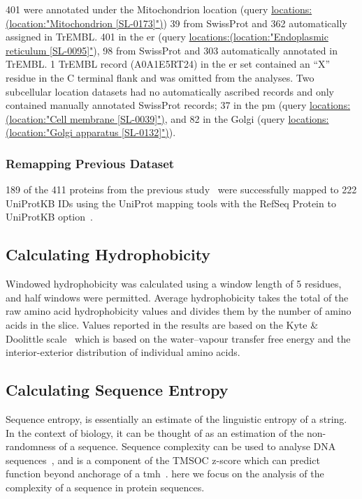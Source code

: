 401 were annotated under the Mitochondrion location (query \url{locations:(location:"Mitochondrion [SL-0173]")}) 39 from SwissProt and 362 automatically assigned in TrEMBL.
401 in the \gls{er} (query \url{locations:(location:"Endoplasmic reticulum [SL-0095]"}), 98 from SwissProt and 303 automatically annotated in TrEMBL.
1 TrEMBL record (A0A1E5RT24) in the \gls{er} set contained an ``X'' residue in the C terminal flank and was omitted from the analyses.
Two subcellular location datasets had no automatically ascribed records and only contained manually annotated SwissProt records; 37 in the \gls{pm} (query \url{locations:(location:"Cell membrane [SL-0039]")}, and 82 in the Golgi (query \url{locations:(location:"Golgi apparatus [SL-0132]")}).

\subsubsection{Remapping Previous Dataset}
189 of the 411 proteins from the previous study~\cite{Kalbfleisch2007} were successfully mapped to 222 UniProtKB IDs using the UniProt mapping tools with the RefSeq Protein to UniProtKB option~\cite{TheUniProtConsortium2014}.

\subsection{Calculating Hydrophobicity}
Windowed hydrophobicity was calculated using a window length of 5 residues, and half windows were permitted.
Average hydrophobicity takes the total of the raw amino acid hydrophobicity values and divides them by the number of amino acids in the slice.
Values reported in the results are based on the Kyte \& Doolittle scale~\cite{Kyte1982} which is based on the water\---vapour transfer free energy and the interior-exterior distribution of individual amino acids.

\subsection{Calculating Sequence Entropy}
Sequence entropy, is essentially an estimate of the linguistic entropy of a string.
In the context of biology, it can be thought of as an estimation of the non-randomness of a sequence.
Sequence complexity can be used to analyse DNA sequences~\cite{Pinho2013, Oliver1993, Troyanskaya2002}, and is a component of the TMSOC z-score which can predict function beyond anchorage of a \gls{tmh}~\cite{Wong2011, Wong2012, Baker2017}.
here we focus on the analysis of the complexity of a sequence in protein sequences.


